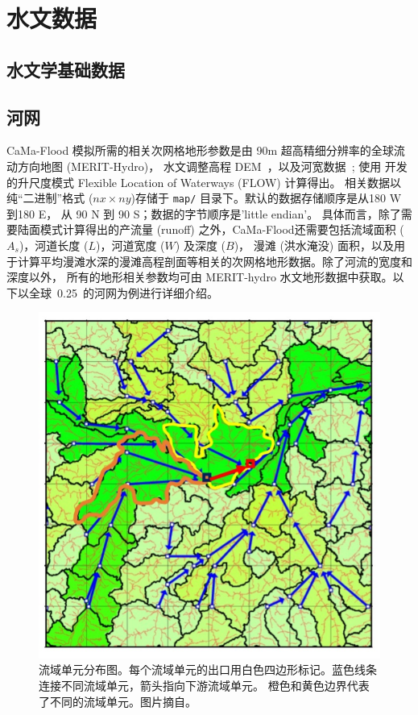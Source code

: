 \section{水文数据}\label{水文数据}
\subsection{水文学基础数据}
\subsection{河网}
CaMa-Flood 模拟所需的相关次网格地形参数是由 90m 超高精细分辨率的全球流动方向地图 (MERIT-Hydro)\citep{yamazaki2019merit}，
水文调整高程 DEM~\citep{yamazaki2017high,yamazaki2012analysis}，以及河宽数据~\citep{yamazaki2014development}; 
使用 \citet{yamazaki2009deriving} 开发的升尺度模式 Flexible Location of Waterways (FLOW) 计算得出。
相关数据以纯``二进制''格式 ($nx\times ny$)存储于 \texttt{map/} 目录下。默认的数据存储顺序是从180 \textdegree W到180 \textdegree E，
从 90 \textdegree N 到 90 \textdegree S；数据的字节顺序是'little endian'。
具体而言，除了需要陆面模式计算得出的产流量 (runoff) 之外，CaMa-Flood还需要包括流域面积 ($A_s$)，河道长度 ($L$)，河道宽度 ($W$) 及深度 ($B$)，
漫滩 (洪水淹没) 面积，以及用于计算平均漫滩水深的漫滩高程剖面等相关的次网格地形数据。除了河流的宽度和深度以外，
所有的地形相关参数均可由 MERIT-hydro 水文地形数据中获取。以下以全球~0.25\textdegree ~的河网为例进行详细介绍。

{
\begin{figure}[]
\centering
\includegraphics{Figures/陆地表面的水分循环/流域单元分布图.png}
\caption{流域单元分布图。每个流域单元的出口用白色四边形标记。蓝色线条连接不同流域单元，箭头指向下游流域单元。
橙色和黄色边界代表了不同的流域单元。图片摘自\citet{yamazaki2013improving}。 }
\label{fig:流域单元分布图}
\end{figure}
}


